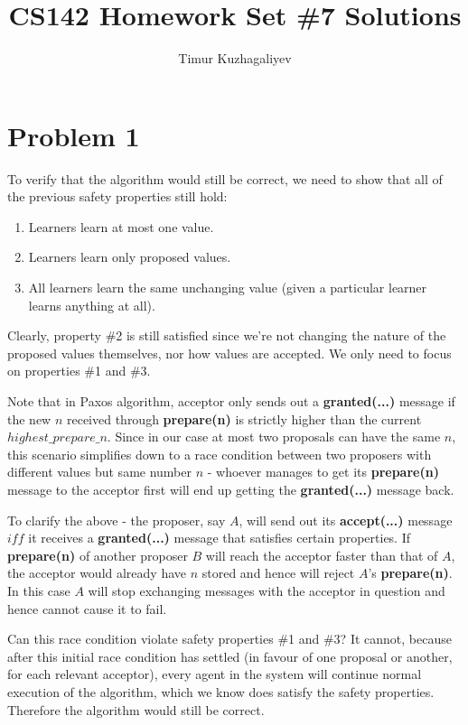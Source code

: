 \documentclass[10pt,letter]{article}
\begin{document}
\title{CS142 Homework Set \#7 Solutions}

\author{Timur Kuzhagaliyev}

 
\maketitle 

\section*{Problem 1}

To verify that the algorithm would still be correct, we need to show that all of the previous safety properties still hold:

\begin{enumerate}
\item Learners learn at most one value.
\item Learners learn only proposed values.
\item All learners learn the same unchanging value (given a particular learner learns anything at all).
\end{enumerate}

Clearly, property \#2 is still satisfied since we're not changing the nature of the proposed values themselves, nor how values are accepted. We only need to focus on properties \#1 and \#3.

Note that in Paxos algorithm, acceptor only sends out a \textbf{granted(...)} message if the new $n$ received through \textbf{prepare(n)} is strictly higher than the current $highest\_prepare\_n$. Since in our case at most two proposals can have the same $n$, this scenario simplifies down to a race condition between two proposers with different values but same number $n$ - whoever manages to get its \textbf{prepare(n)} message to the acceptor first will end up getting the \textbf{granted(...)} message back.

To clarify the above - the proposer, say $A$, will send out its \textbf{accept(...)} message $iff$ it receives a \textbf{granted(...)} message that satisfies certain properties. If \textbf{prepare(n)} of another proposer $B$ will reach the acceptor faster than that of $A$, the acceptor would already have $n$ stored and hence will reject $A$'s \textbf{prepare(n)}. In this case $A$ will stop exchanging messages with the acceptor in question and hence cannot cause it to fail. 

Can this race condition violate safety properties \#1 and \#3? It cannot, because after this initial race condition has settled (in favour of one proposal or another, for each relevant acceptor), every agent in the system will continue normal execution of the algorithm, which we know does satisfy the safety properties. Therefore the algorithm would still be correct.
\end{document}
